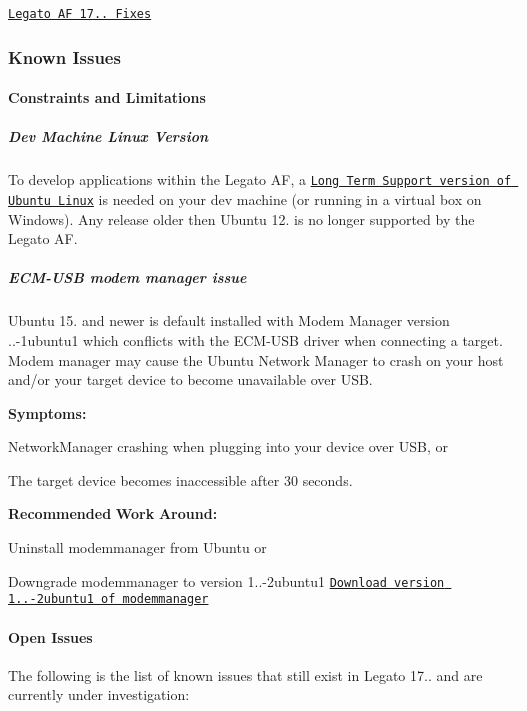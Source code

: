 \href{https://github.com/legatoproject/legato-af/commits/17.05.0}{\tt Legato AF 17.. Fixes}\hypertarget{releaseNotes17050_rn17_05_KnownIssues}{}\subsubsection{Known Issues}\label{releaseNotes17050_rn17_05_KnownIssues}
\hypertarget{releaseNotes17050_rn17_05_Constraints}{}\paragraph{Constraints and Limitations}\label{releaseNotes17050_rn17_05_Constraints}
\hypertarget{releaseNotes17050_rn17_05_ContraintsLinuxSupport}{}\subparagraph{Dev Machine Linux Version}\label{releaseNotes17050_rn17_05_ContraintsLinuxSupport}
To develop applications within the Legato AF, a \href{https://www.ubuntu.com/info/release-end-of-life}{\tt Long Term Support version of Ubuntu Linux} is needed on your dev machine (or running in a virtual box on Windows). Any release older then Ubuntu 12. is no longer supported by the Legato AF.\hypertarget{releaseNotes17050_rn17_05_ConstECMUSB}{}\subparagraph{E\+C\+M-\/\+U\+S\+B modem manager issue}\label{releaseNotes17050_rn17_05_ConstECMUSB}
Ubuntu 15. and newer is default installed with Modem Manager version {..-\/1ubuntu1} which conflicts with the E\+C\+M-\/\+U\+SB driver when connecting a target. Modem manager may cause the Ubuntu Network Manager to crash on your host and/or your target device to become unavailable over U\+SB.

{\bfseries Symptoms\+:} 
\begin{DoxyItemize}
\item Network\+Manager crashing when plugging into your device over U\+SB, or
\item The target device becomes inaccessible after 30 seconds.
\end{DoxyItemize}

{\bfseries Recommended} {\bfseries Work} {\bfseries Around\+:} 
\begin{DoxyItemize}
\item Uninstall {\ttfamily modemmanager} from Ubuntu or
\item Downgrade {\ttfamily modemmanager} to version 1..-\/2ubuntu1 \href{http://packages.ubuntu.com/trusty/modemmanager}{\tt Download version 1..-\/2ubuntu1 of modemmanager}
\end{DoxyItemize}\hypertarget{releaseNotes17050_rn17_05_OpenIssues}{}\paragraph{Open Issues}\label{releaseNotes17050_rn17_05_OpenIssues}
The following is the list of known issues that still exist in Legato 17.. and are currently under investigation\+:

